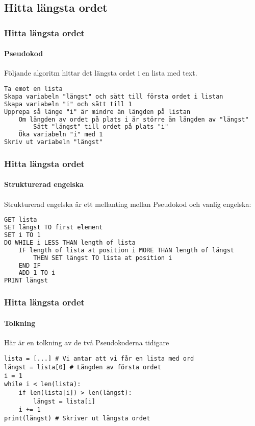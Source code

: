 \documentclass[aspectratio=169]{beamer}
\begin{document}
\subsection{Hitta längsta ordet}

\begin{frame}[fragile]
	\frametitle{Hitta längsta ordet}
	\framesubtitle{Pseudokod}

	Följande algoritm hittar det längsta ordet i en lista med text.

	\begin{lstlisting}[language=TeX]
Ta emot en lista
Skapa variabeln "längst" och sätt till första ordet i listan
Skapa variabeln "i" och sätt till 1
Upprepa så länge "i" är mindre än längden på listan
    Om längden av ordet på plats i är större än längden av "längst"
        Sätt "längst" till ordet på plats "i"
    Öka variabeln "i" med 1
Skriv ut variabeln "längst"
	\end{lstlisting}

\end{frame}

\begin{frame}[fragile]
	\frametitle{Hitta längsta ordet}
	\framesubtitle{Strukturerad engelska}

	Strukturerad engelska är ett mellanting mellan Pseudokod och vanlig engelska:

	\begin{lstlisting}[language=TeX]
GET lista
SET längst TO first element
SET i TO 1
DO WHILE i LESS THAN length of lista
    IF length of lista at position i MORE THAN length of längst
        THEN SET längst TO lista at position i
    END IF
    ADD 1 TO i
PRINT längst
	\end{lstlisting}
	
\end{frame}

\begin{frame}[fragile]
	\frametitle{Hitta längsta ordet}
	\framesubtitle{Tolkning}

	Här är en tolkning av de två Pseudokoderna tidigare

	\begin{lstlisting}
lista = [...] # Vi antar att vi får en lista med ord
längst = lista[0] # Längden av första ordet
i = 1
while i < len(lista):
    if len(lista[i]) > len(längst):
        längst = lista[i]
    i += 1
print(längst) # Skriver ut längsta ordet
	\end{lstlisting}

\end{frame}
\end{document}
